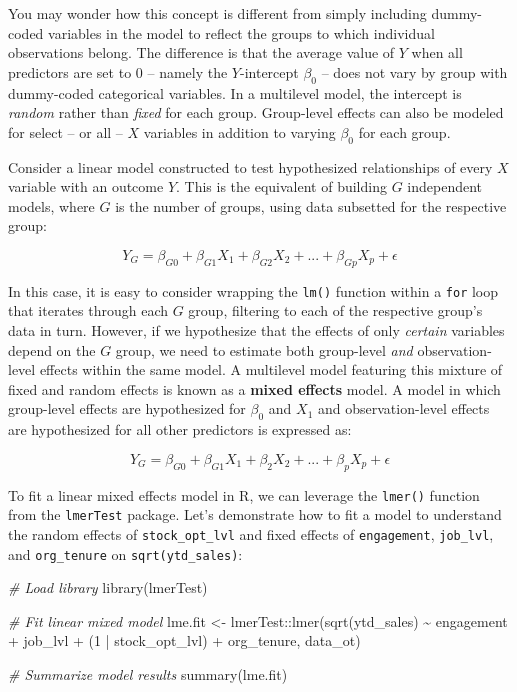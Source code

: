 \documentclass[
]{book}
\newenvironment{Shaded}{\begin{snugshade}}{\end{snugshade}}
\newcommand{\CommentTok}[1]{\textcolor[rgb]{0.56,0.35,0.01}{\textit{#1}}}
\newcommand{\DecValTok}[1]{\textcolor[rgb]{0.00,0.00,0.81}{#1}}
\newcommand{\FunctionTok}[1]{\textcolor[rgb]{0.00,0.00,0.00}{#1}}
\newcommand{\NormalTok}[1]{#1}
\newcommand{\OtherTok}[1]{\textcolor[rgb]{0.56,0.35,0.01}{#1}}
\newcommand{\SpecialCharTok}[1]{\textcolor[rgb]{0.00,0.00,0.00}{#1}}
\begin{document}
You may wonder how this concept is different from simply including dummy-coded variables in the model to reflect the groups to which individual observations belong. The difference is that the average value of \(Y\) when all predictors are set to 0 -- namely the \(Y\)-intercept \(\beta_0\) -- does not vary by group with dummy-coded categorical variables. In a multilevel model, the intercept is \emph{random} rather than \emph{fixed} for each group. Group-level effects can also be modeled for select -- or all -- \(X\) variables in addition to varying \(\beta_0\) for each group.

Consider a linear model constructed to test hypothesized relationships of every \(X\) variable with an outcome \(Y\). This is the equivalent of building \(G\) independent models, where \(G\) is the number of groups, using data subsetted for the respective group:

\[ Y_G = \beta_{G0} + \beta_{G1} X_1 + \beta_{G2} X_2 + {...} + \beta_{Gp} X_p + \epsilon \]

In this case, it is easy to consider wrapping the \texttt{lm()} function within a \texttt{for} loop that iterates through each \(G\) group, filtering to each of the respective group's data in turn. However, if we hypothesize that the effects of only \emph{certain} variables depend on the \(G\) group, we need to estimate both group-level \emph{and} observation-level effects within the same model. A multilevel model featuring this mixture of fixed and random effects is known as a \textbf{mixed effects} model. A model in which group-level effects are hypothesized for \(\beta_0\) and \(X_1\) and observation-level effects are hypothesized for all other predictors is expressed as:

\[ Y_G = \beta_{G0} + \beta_{G1} X_1 + \beta_2 X_2 + {...} + \beta_p X_p + \epsilon \]

To fit a linear mixed effects model in R, we can leverage the \texttt{lmer()} function from the \texttt{lmerTest} package. Let's demonstrate how to fit a model to understand the random effects of \texttt{stock\_opt\_lvl} and fixed effects of \texttt{engagement}, \texttt{job\_lvl}, and \texttt{org\_tenure} on \texttt{sqrt(ytd\_sales)}:

\begin{Shaded}
\begin{Highlighting}[]
\CommentTok{\# Load library}
\FunctionTok{library}\NormalTok{(lmerTest)}

\CommentTok{\# Fit linear mixed model}
\NormalTok{lme.fit }\OtherTok{\textless{}{-}}\NormalTok{ lmerTest}\SpecialCharTok{::}\FunctionTok{lmer}\NormalTok{(}\FunctionTok{sqrt}\NormalTok{(ytd\_sales) }\SpecialCharTok{\textasciitilde{}}\NormalTok{ engagement }\SpecialCharTok{+}\NormalTok{ job\_lvl }\SpecialCharTok{+}\NormalTok{ (}\DecValTok{1} \SpecialCharTok{|}\NormalTok{ stock\_opt\_lvl) }\SpecialCharTok{+}\NormalTok{ org\_tenure, data\_ot)}

\CommentTok{\# Summarize model results}
\FunctionTok{summary}\NormalTok{(lme.fit)}
\end{Highlighting}
\end{Shaded}
\end{document}
